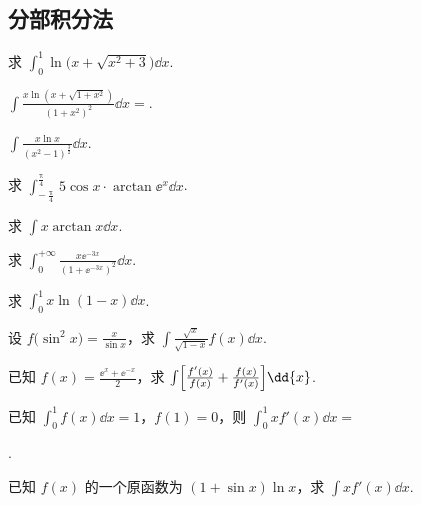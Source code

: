 \subsection{分部积分法}

	\begin{ti}
		求 $\int_{0}^{1} \ln \bigl( x + \sqrt{x^{2} + 3} \bigr) \dd{x}$.
	\end{ti}

	\begin{ti}
		$\int \frac{x \ln ( x + \sqrt{1 + x^{2}} )}{\left( 1 + x^{2} \right)^{2}} \dd{x} = $.
	\end{ti}

	\begin{ti}
		$\int \frac{x \ln x}{\left( x^{2} - 1 \right)^{\frac{3}{2}}} \dd{x}$.
	\end{ti}

	\begin{ti}
		求 $\int_{-\frac{\uppi}{4}}^{\frac{\uppi}{4}} 5 \cos x \cdot \arctan \ee^{x} \dd{x}$.
	\end{ti}

	\begin{ti}
		求 $\int x \arctan x \dd{x}$.
	\end{ti}

	\begin{ti}
		求 $\int_{0}^{+\infty} \frac{x \ee^{-3x}}{\left( 1 + \ee^{-3x} \right)^{2}} \dd{x}$.
	\end{ti}

	\begin{ti}
		求 $\int_{0}^{1} x \ln (1 - x) \dd{x}$.
	\end{ti}

	\begin{ti}
		设 $f\bigl( \sin^{2}x \bigr) = \frac{x}{\sin x}$，求 $\int \frac{\sqrt{x}}{\sqrt{1 - x}} f(x) \dd{x}$.
	\end{ti}

	\begin{ti}
		已知 $f(x) = \frac{\ee^{x} + \ee^{-x}}{2}$，求 $\int \Bigl[ \frac{f'(x)}{f(x)} + \frac{f(x)}{f'(x)} \Bigr] \dd{x}$.
	\end{ti}

	\begin{ti}
		已知 $\int_{0}^{1} f(x) \dd{x} = 1$，$f(1) = 0$，则 $\int_{0}^{1} x f'(x) \dd{x} = $
		
		\noindent\hone{4}.
	\end{ti}

	\begin{ti}
		已知 $f(x)$ 的一个原函数为 $(1 + \sin x) \ln x$，求 $\int x f'(x) \dd{x}$.
	\end{ti}

